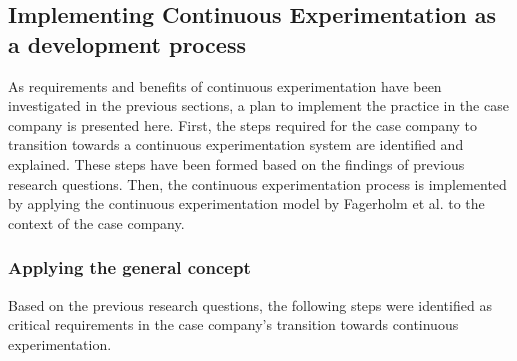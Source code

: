 \documentclass[english]{tktltiki2}
\theoremstyle{definition}
\theoremstyle{remark}
\begin{document}


\subsection{Implementing Continuous Experimentation as a development process}
As requirements and benefits of continuous experimentation have been investigated in the previous sections, a plan to implement the practice in the case company is presented here. First, the steps required for the case company to transition towards a continuous experimentation system are identified and explained. These steps have been formed based on the findings of previous research questions. Then, the continuous experimentation process is implemented by applying the continuous experimentation model by Fagerholm et al. \cite{fagerholm2014building} to the context of the case company. 
\subsubsection{Applying the general concept}


Based on the previous research questions, the following steps were identified as critical requirements in the case company's transition towards continuous experimentation.
\end{document}
